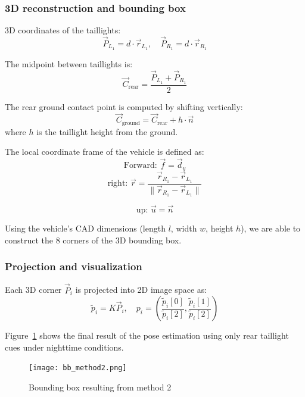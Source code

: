 \subsubsection{3D reconstruction and bounding box}

3D coordinates of the taillights:
\[
\vec{P}_{L_1} = d \cdot \vec{r}_{L_1}, \quad \vec{P}_{R_1} = d \cdot \vec{r}_{R_1}
\]

The midpoint between taillights is:
\[
\vec{C}_{\text{rear}} = \frac{\vec{P}_{L_1} + \vec{P}_{R_1}}{2}
\]

The rear ground contact point is computed by shifting vertically:
\[
\vec{C}_{\text{ground}} = \vec{C}_{\text{rear}} + h \cdot \vec{n}
\]
where \( h \) is the taillight height from the ground.

The local coordinate frame of the vehicle is defined as:
\[
\text{Forward: } \vec{f} = \vec{d}_y \] \[\text{right: } \vec{r} = \frac{\vec{r}_{R_1} - \vec{r}_{L_1}}{\|\vec{r}_{R_1} - \vec{r}_{L_1}\|} \]

\[\text{up: } \vec{u} = \vec{n}
\]

Using the vehicle’s CAD dimensions (length \( l \), width \( w \), height \( h \)), we are able to construct the 8 corners of the 3D bounding box.

\subsubsection{Projection and visualization}

Each 3D corner \( \vec{P}_i \) is projected into 2D image space as:
\[
\tilde{p}_i = K \vec{P}_i, \quad p_i = \left( \frac{\tilde{p}_i[0]}{\tilde{p}_i[2]}, \frac{\tilde{p}_i[1]}{\tilde{p}_i[2]} \right)
\]

Figure~\ref{fig:method2_result} shows the final result of the pose estimation using only rear taillight cues under nighttime conditions.

\begin{figure}[H]
    \centering
    \texttt{[image: bb\_method2.png]}
    \caption{Bounding box resulting from method 2}
    \label{fig:method2_result}
\end{figure}